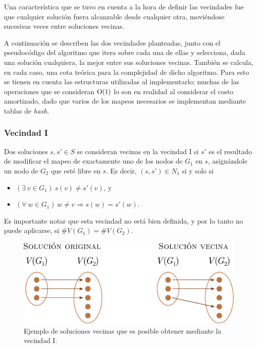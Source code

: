 Una característica que se tuvo en cuenta a la hora de definir las vecindades
fue que cualquier solución fuera alcanzable desde cualquier otra, moviéndose
sucesivas veces entre soluciones vecinas.

A continuación se describen las dos vecindades planteadas, junto con el
pseudocódigo del algoritmo que itera sobre cada una de ellas y selecciona,
dada una solución cualquiera, la mejor entre sus soluciones vecinas. También
se calcula, en cada caso, una cota teórica para la complejidad de dicho
algoritmo. Para esto se tienen en cuenta las estructuras utilizadas al
implementarlo; muchas de las operaciones que se consideran $\operatorname{O}(1)$ lo son en
realidad al considerar el costo amortizado, dado que varios de los mapeos
necesarios se implementan mediante tablas de \emph{hash}.

\subsubsection{Vecindad I}
Dos soluciones $s, s' \in S$ se consideran vecinas en la vecindad I
si $s'$ es el resultado de modificar el mapeo de exactamente uno de los nodos
de $G_1$ en $s$, asignándole un nodo de $G_2$ que esté libre en $s$. Es
decir, $(s, s') \in N_1$ si y solo si
\begin{itemize}
    \item $(\exists \ v \in G_1)\ s(v) \neq s'(v)$, y
    \item $(\forall \ w \in G_1)\ w \neq v \Rightarrow s(w) = s'(w)$.
\end{itemize}

Es importante notar que esta vecindad no está bien definida, y por lo tanto no
puede aplicarse, si $\#V(G_1) = \#V (G_2)$.

\begin{figure}[htbp]
    \centering
    \includegraphics{imagenes/ex5_vecindad1.pdf}
    \caption{Ejemplo de soluciones vecinas que es posible obtener mediante la
    vecindad I.}
    \label{fig:ej5:vecindad1}
\end{figure}

